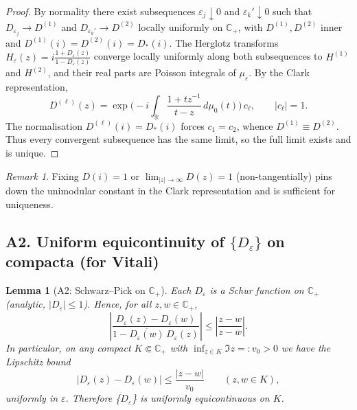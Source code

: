 ﻿\documentclass[12pt,a4paper]{article}
\newtheorem{lemma}[theorem]{Lemma}
\theoremstyle{definition}
\theoremstyle{remark}
\newtheorem{remark}[theorem]{Remark}
\newcommand{\RR}{\mathbb{R}}
\begin{document}
\begin{proof}
By normality there exist subsequences $\varepsilon_j\downarrow0$ and $\varepsilon_k'\downarrow0$ such that $D_{\varepsilon_j}\to D^{(1)}$ and $D_{\varepsilon_k'}\to D^{(2)}$ locally uniformly on $\mathbb{C}_+$, with $D^{(1)},D^{(2)}$ inner and $D^{(1)}(i)=D^{(2)}(i)=D_*(i)$. The Herglotz transforms $H_{\varepsilon}(z)=i\frac{1+D_\varepsilon(z)}{1-D_\varepsilon(z)}$ converge locally uniformly along both subsequences to $H^{(1)}$ and $H^{(2)}$, and their real parts are Poisson integrals of $\mu_{\varepsilon}$. By the Clark representation,
\begin{equation*}
  D^{(\ell)}(z)=\exp\Big(-i\int_{\RR}\frac{1+t z^{-1}}{t-z}\,d\mu_0(t)\Big)\,c_\ell,\qquad |c_\ell|=1.
\end{equation*}
The normalisation $D^{(\ell)}(i)=D_*(i)$ forces $c_1=c_2$, whence $D^{(1)}\equiv D^{(2)}$. Thus every convergent subsequence has the same limit, so the full limit exists and is unique.
\end{proof}

\begin{remark}
Fixing $D(i)=1$ or $\lim_{|z|\to\infty}D(z)=1$ (non-tangentially) pins down the unimodular constant in the Clark representation and is sufficient for uniqueness.
\end{remark}

\subsection{A2. Uniform equicontinuity of \texorpdfstring{$\{D_\varepsilon\}$}{D-epsilon family} on compacta (for Vitali)}

\begin{lemma}[A2: Schwarz--Pick on $\mathbb{C}_+$]
\label{lem:A2}
Each $D_\varepsilon$ is a Schur function on $\mathbb{C}_+$ (analytic, $|D_\varepsilon|\le1$). Hence, for all $z,w\in\mathbb{C}_+$,
\begin{equation}
\label{eq:SP}
  \left|\frac{D_\varepsilon(z)-D_\varepsilon(w)}{1-\overline{D_\varepsilon(w)}\,D_\varepsilon(z)}\right| \le \left|\frac{z-w}{z-\overline{w}}\right|.
\end{equation}
In particular, on any compact $K\Subset\mathbb{C}_+$ with $\inf_{z\in K}\Im z=:v_0>0$ we have the Lipschitz bound
\begin{equation*}
  |D_\varepsilon(z)-D_\varepsilon(w)| \le \frac{|z-w|}{v_0}\qquad (z,w\in K),
\end{equation*}
uniformly in $\varepsilon$. Therefore {\{$D_\varepsilon$\}} is uniformly equicontinuous on $K$.
\end{lemma}
\end{document}
